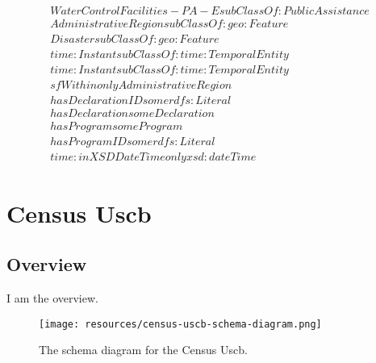\begin{align}
  WaterControlFacilities-PA-E subClassOf: PublicAssistance\\
  AdministrativeRegion subClassOf: geo:Feature\\
  Disaster subClassOf: geo:Feature\\
  time:Instant subClassOf: time:TemporalEntity\\
  time:Instant subClassOf: time:TemporalEntity\\
  sfWithin only AdministrativeRegion \\
  hasDeclarationID some rdfs:Literal \\
  hasDeclaration some Declaration \\
  hasProgram some Program \\
  hasProgramID some rdfs:Literal \\
  time:inXSDDateTime only xsd:dateTime \end{align}



\section{Census Uscb}
\label{sec:census-uscb}
\subsection{Overview}
\label{ssec:overview}

I am the overview.

\begin{figure}[h!]
  \begin{center}
    \texttt{[image: resources/census-uscb-schema-diagram.png]}
  \end{center}
  \caption{The schema diagram for the Census Uscb.}
  \label{fig:ov-diagram}
\end{figure}


